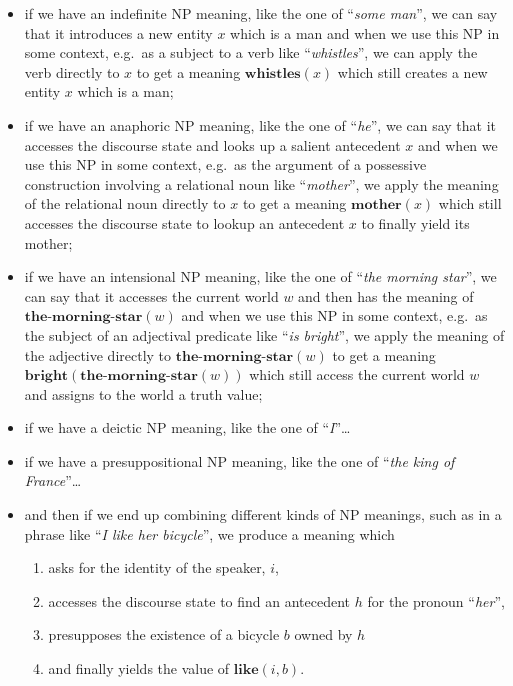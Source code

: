 \documentclass[a4paper,11pt,DIV=12]{scrartcl}
\newcommand{\semdom}[1]{\textbf{#1}}
\begin{document}
\begin{itemize}
\item if we have an indefinite NP meaning, like the one of ``\textit{some
  man}'', we can say that it introduces a new entity $x$ which is a man and
  when we use this NP in some context, e.g.\ as a subject to a verb like
  ``\textit{whistles}'', we can apply the verb directly to $x$ to get a
  meaning $\semdom{whistles}(x)$ which still creates a new entity $x$ which
  is a man;

\item if we have an anaphoric NP meaning, like the one of ``\textit{he}'',
  we can say that it accesses the discourse state and looks up a salient
  antecedent $x$ and when we use this NP in some context, e.g.\ as the
  argument of a possessive construction involving a relational noun like
  ``\textit{mother}'', we apply the meaning of the relational noun
  directly to $x$ to get a meaning $\semdom{mother}(x)$ which still
  accesses the discourse state to lookup an antecedent $x$ to finally yield
  its mother;

\item if we have an intensional NP meaning, like the one of ``\textit{the
  morning star}'', we can say that it accesses the current world $w$ and
  then has the meaning of $\semdom{the-morning-star}(w)$ and when we use
  this NP in some context, e.g.\ as the subject of an adjectival predicate
  like ``\textit{is bright}'', we apply the meaning of the adjective
  directly to $\semdom{the-morning-star}(w)$ to get a meaning
  $\semdom{bright}(\semdom{the-morning-star}(w))$ which still access the
  current world $w$ and assigns to the world a truth value;

\item if we have a deictic NP meaning, like the one of ``\textit{I}''\ldots

\item if we have a presuppositional NP meaning, like the one of
  ``\textit{the king of France}''\ldots

\item and then if we end up combining different kinds of NP meanings, such
  as in a phrase like ``\textit{I like her bicycle}'', we produce a meaning
  which
  \begin{enumerate}
  \item asks for the identity of the speaker, $i$,
  \item accesses the discourse state to find an antecedent $h$ for the
    pronoun ``\textit{her}'',
  \item presupposes the existence of a bicycle $b$ owned by $h$
  \item and finally yields the value of $\semdom{like}(i, b)$.
\end{enumerate}
\end{itemize}
\end{document}

